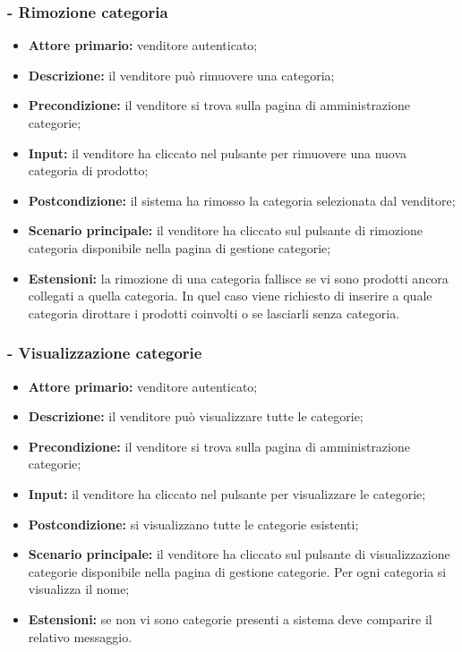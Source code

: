 \subsubsection{- Rimozione categoria}
\begin{itemize}
    \item \textbf{Attore primario:} venditore autenticato;
    \item \textbf{Descrizione:} il venditore può rimuovere una categoria;
    \item \textbf{Precondizione:} il venditore si trova sulla pagina di amministrazione categorie;
    \item \textbf{Input:} il venditore ha cliccato nel pulsante per rimuovere una nuova categoria di prodotto;
    \item \textbf{Postcondizione:} il sistema ha rimosso la categoria selezionata dal venditore;
    \item \textbf{Scenario principale:} il venditore ha cliccato sul pulsante di rimozione categoria disponibile nella pagina di gestione categorie;
    \item \textbf{Estensioni:} la rimozione di una categoria fallisce se vi sono prodotti ancora collegati a quella categoria. In quel caso viene richiesto
          di inserire a quale categoria dirottare i prodotti coinvolti o se lasciarli senza categoria.
\end{itemize}

\stepsubUserCase
\subsubsection{- Visualizzazione categorie}
\begin{itemize}
    \item \textbf{Attore primario:} venditore autenticato;
    \item \textbf{Descrizione:} il venditore può visualizzare tutte le categorie;
    \item \textbf{Precondizione:} il venditore si trova sulla pagina di amministrazione categorie;
    \item \textbf{Input:} il venditore ha cliccato nel pulsante per visualizzare le categorie;
    \item \textbf{Postcondizione:} si visualizzano tutte le categorie esistenti;
    \item \textbf{Scenario principale:} il venditore ha cliccato sul pulsante di visualizzazione categorie disponibile nella pagina di gestione categorie. Per ogni categoria si visualizza il nome;
    \item \textbf{Estensioni:} se non vi sono categorie presenti a sistema deve comparire il relativo messaggio.
\end{itemize}

